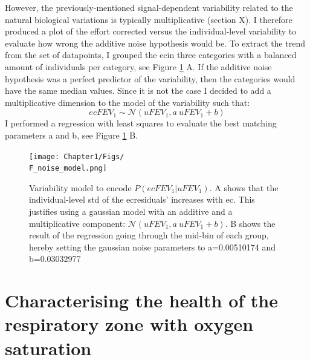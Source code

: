 However, the previously-mentioned signal-dependent variability related to the natural biological variations is typically multiplicative (section X). I therefore produced a plot of the effort corrected \F versus the individual-level variability to evaluate how wrong the additive noise hypothesis would be. To extract the trend from the set of datapoints, I grouped the ec\F in three categories with a balanced amount of individuals per category, see Figure \ref{fig:\F_noise_model} A. If the additive noise hypothesis was a perfect predictor of the variability, then the categories would have the same median values. Since it is not the case I decided to add a multiplicative dimension to the model of the \F variability such that:
\begin{equation}
    ecF\!EV_1 \sim \mathcal{N}(uF\!EV_1, a\ uF\!EV_1 + b)
\end{equation}
I performed a regression with least squares to evaluate the best matching parameters a and b, see Figure \ref{fig:\F_noise_model} B. 

\begin{figure}[!h]
    \caption{Variability model to encode $P(ecF\!EV_1 | uF\!EV_1)$.  A shows that the individual-level std of the ec\F residuals' increases with ec\F. This justifies using a gaussian model with an additive and a multiplicative component: $\mathcal{N}(uF\!EV_1, a\ uF\!EV_1 + b)$. B shows the result of the regression going through the mid-bin of each group, hereby setting the gaussian noise parameters to a=0.00510174 and b=0.03032977}
    \centering
    \texttt{[image: Chapter1/Figs/\\F\_noise\_model.png]}
    \label{fig:\F_noise_model}
\end{figure}


\section{Characterising the health of the respiratory zone with oxygen saturation}

